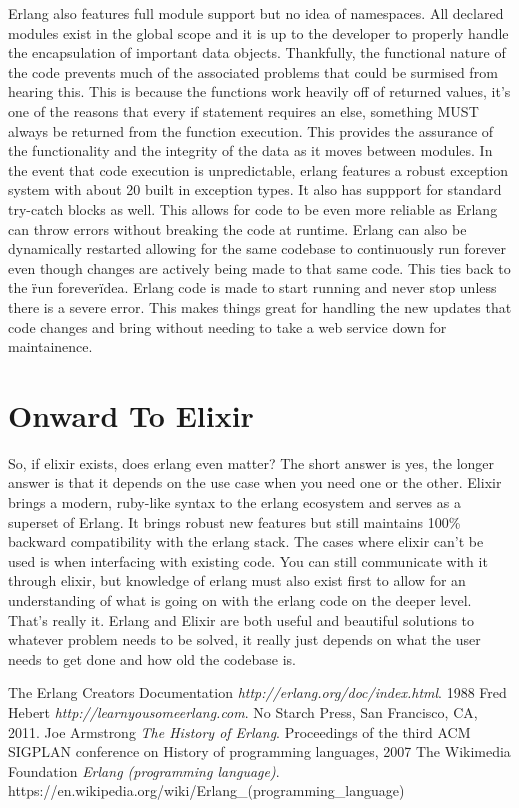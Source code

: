 \documentclass[11pt]{article}
\begin{document}
Erlang also features full module support but no idea of namespaces. All declared modules exist in the global scope and it is up to the developer to properly handle the encapsulation of important data objects. Thankfully, the functional nature of the code prevents much of the associated problems that could be surmised from hearing this. This is because the functions work heavily off of returned values, it's one of the reasons that every if statement requires an else, something MUST always be returned from the function
execution. This provides the assurance of the functionality and the integrity of the data as it moves between modules. In the event that code execution is unpredictable, erlang features a robust exception system with about 20 built in exception types. It also
has suppport for standard try-catch blocks as well. This allows for code to be even more reliable as Erlang can throw errors without breaking the code at runtime. Erlang can also be dynamically restarted allowing for the same codebase to continuously run
forever even though changes are actively being made to that same code. This ties back to the \"run forever\" idea. Erlang code is made to start running and never stop unless there is a severe error. This makes things great for handling the new updates that code
changes and bring without needing to take a web service down for maintainence.

\section{Onward To Elixir}
So, if elixir exists, does erlang even matter? The short answer is yes, the longer answer is that it depends on the use case when you need one or the other. Elixir brings
a modern, ruby-like syntax to the erlang ecosystem and serves as a superset of Erlang. It brings robust new features but still maintains 100\% backward compatibility with
the erlang stack. The cases where elixir can't be used is when interfacing with existing code. You can still communicate with it through elixir, but knowledge of erlang
must also exist first to allow for an understanding of what is going on with the erlang code on the deeper level. That's really it. Erlang and Elixir are both useful and
beautiful solutions to whatever problem needs to be solved, it really just depends on what the user needs to get done and how old the codebase is.

\begin{thebibliography}{9}
    The Erlang Creators Documentation
    \textit{http://erlang.org/doc/index.html}.
    1988
    Fred Hebert
    \textit{http://learnyousomeerlang.com}.
    No Starch Press, San Francisco, CA, 2011.
    Joe Armstrong
    \textit{The History of Erlang}.
    Proceedings of the third ACM SIGPLAN conference on History of programming languages, 2007
    The Wikimedia Foundation
    \textit{Erlang (programming language)}.
    https://en.wikipedia.org/wiki/Erlang\_(programming\_language)

\end{thebibliography}
\end{document}
